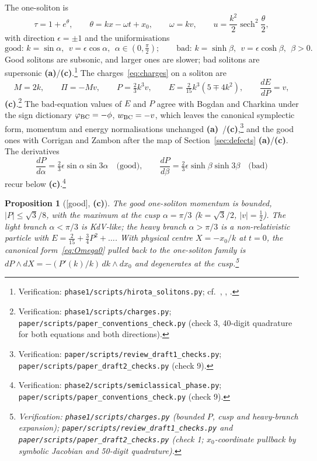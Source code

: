 \documentclass[11pt,a4paper]{article}
\newcommand{\lab}[1]{{\normalfont\sffamily\footnotesize\bfseries(#1)}}
\newcommand{\La}{\lab{a}}
\newcommand{\Lc}{\lab{c}}
\newcommand{\eqtag}[2]{{\normalfont\sffamily\footnotesize\textcolor{#1}{[#2]}}}
\newcommand{\Good}{\eqtag{teal!70!black}{good}}
\newcommand{\scr}[1]{\nolinkurl{#1}}
\newcommand{\chk}[1]{\footnote{\raggedright Verification: #1.}}
\newcommand{\sech}{\operatorname{sech}}
\newtheorem{proposition}{Proposition}[section]
\theoremstyle{remark}
\begin{document}
The one-soliton is
\begin{equation}\label{eq:1sol}
\tau=1+e^{\theta},\qquad \theta=kx-\omega t+x_0,\qquad \omega=kv,\qquad u=\frac{k^2}2\sech^2\frac\theta2 ,
\end{equation}
with direction $\epsilon=\pm1$ and the uniformisations
\begin{equation}\label{eq:rapidity}
\text{good: } k=\sin\alpha,\ \ v=\epsilon\cos\alpha,\ \ \alpha\in(0,\tfrac\pi2);\qquad
\text{bad: } k=\sinh\beta,\ \ v=\epsilon\cosh\beta,\ \ \beta>0 .
\end{equation}
Good solitons are subsonic, and larger ones are slower; bad solitons are supersonic \La/\Lc.\chk{\scr{phase1/scripts/hirota_solitons.py}; cf.\ \cite[(18)]{BD}, \cite[(2.8)]{CZ}, \cite[(11)]{BC}} The charges~\eqref{eq:charges} on a soliton are
\begin{equation}\label{eq:solcharges}
M=2k,\qquad \Pi=-Mv,\qquad P=\tfrac23k^3v,\qquad E=\tfrac2{15}k^3(5\mp4k^2),\qquad \frac{dE}{dP}=v ,
\end{equation}
\Lc.\chk{\scr{phase1/scripts/charges.py}; \scr{paper/scripts/paper_conventions_check.py} (check 3, 40-digit quadrature for both equations and both directions)}
The bad-equation values of $E$ and $P$ agree with Bogdan and Charkina under the sign dictionary $\varphi_{\rm BC}=-\phi$, $w_{\rm BC}=-v$, which leaves the canonical symplectic form, momentum and energy normalisations unchanged \La~\cite[(14),(16),(18)]{BC}/\Lc,\chk{\scr{paper/scripts/review_draft1_checks.py}; \scr{paper/scripts/paper_draft2_checks.py} (check 9)} and the good ones with Corrigan and Zambon after the map of Section~\ref{sec:defects} \La/\Lc. The derivatives
\begin{equation}\label{eq:dP}
\frac{dP}{d\alpha}=\tfrac23\epsilon\sin\alpha\sin3\alpha\quad\text{(good)},\qquad \frac{dP}{d\beta}=\tfrac23\epsilon\sinh\beta\sinh3\beta\quad\text{(bad)}
\end{equation}
recur below \Lc.\chk{\scr{phase2/scripts/semiclassical_phase.py}; \scr{paper/scripts/paper_conventions_check.py} (check 9)}

\begin{proposition}[\Good, \Lc]\label{prop:EP}
The good one-soliton momentum is bounded, $|P|\le\sqrt3/8$, with the maximum at the cusp $\alpha=\pi/3$ ($k=\sqrt3/2$, $|v|=\tfrac12$). The light branch $\alpha<\pi/3$ is KdV-like; the heavy branch $\alpha>\pi/3$ is a non-relativistic particle with $E=\tfrac2{15}+\tfrac34P^2+\dots$. With physical centre $X=-x_0/k$ at $t=0$, the canonical form~\eqref{eq:Omega0} pulled back to the one-soliton family is $dP\wedge dX=-(P'(k)/k)\,dk\wedge dx_0$ and degenerates at the cusp.\chk{\scr{phase1/scripts/charges.py} (bounded $P$, cusp and heavy-branch expansion); \scr{paper/scripts/review_draft1_checks.py} and \scr{paper/scripts/paper_draft2_checks.py} (check 1; $x_0$-coordinate pullback by symbolic Jacobian and 50-digit quadrature)}
\end{proposition}
\end{document}

